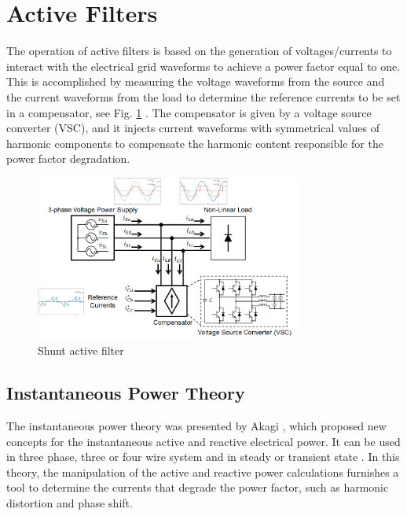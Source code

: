 \section{Active Filters}

The operation of active filters is based on the generation of voltages/currents to interact with the electrical grid waveforms to achieve a power factor equal to one. This is accomplished by measuring the voltage waveforms from the source and the current waveforms from the load to determine the reference currents to be set in a compensator, see Fig. \ref{fig:compensador.png} \citep{Akagi2006}. The compensator is given by a voltage source converter (VSC), and it injects current waveforms with symmetrical values of harmonic components to compensate the harmonic content responsible for the power factor degradation.

\begin{figure}[!h]
	\centering
	\includegraphics[width=0.78\textwidth]{Figures/compensador.png}
	\caption{Shunt active filter}
	\label{fig:compensador.png}
\end{figure}



\subsection{Instantaneous Power Theory}

The instantaneous power theory was presented by Akagi \citep{Akagi1984}, which proposed new concepts for the instantaneous active and reactive electrical power. It can be used in three phase, three or four wire system and in steady or transient state \citep{Akagi2007}. In this theory, the manipulation of the active and reactive power calculations furnishes a tool to determine the currents that degrade the power factor, such as harmonic distortion and phase shift.

